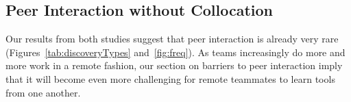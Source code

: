 \documentclass[smallextended]{svjour3}
\newcommand\discovery{peer interaction\xspace}
\newcommand\DisCovery{Peer Interaction\xspace}
\begin{document}
% 
% 
% 
% 

\subsection{\DisCovery without Collocation}

\noindent
Our results from both studies suggest that \discovery is already
very rare (Figures~\ref{tab:discoveryTypes} and~\ref{fig:freq}).
As teams increasingly do more and more work in a remote fashion,
our section on barriers to \discovery imply that
it will become even more challenging for remote teammates to learn
tools from one another.
\end{document}
